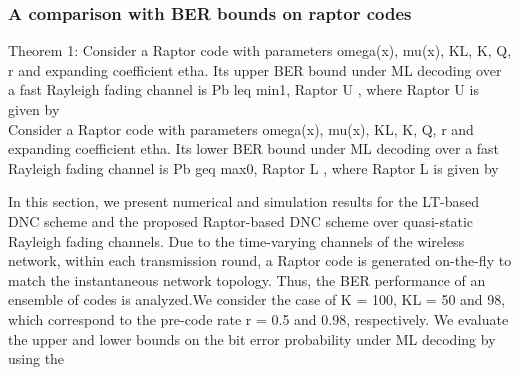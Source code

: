 \subsubsection{A comparison with BER bounds on raptor codes}
Theorem 1: Consider a Raptor code with parameters omega(x),
mu(x), KL, K, Q, r and expanding coefficient etha. Its upper
BER bound under ML decoding over a fast Rayleigh fading
channel is Pb leq min{1, Raptor
U
}, where Raptor
U is given by\\

Consider a Raptor code with parameters omega(x),
mu(x), KL, K, Q, r and expanding coefficient etha. Its lower
BER bound under ML decoding over a fast Rayleigh fading
channel is Pb geq max{0, Raptor
L
}, where Raptor
L is given by

In this section, we present numerical and simulation results
for the LT-based DNC scheme and the proposed Raptor-based
DNC scheme over quasi-static Rayleigh fading channels. Due
to the time-varying channels of the wireless network, within
each transmission round, a Raptor code is generated on-the-fly
to match the instantaneous network topology. Thus, the BER
performance of an ensemble of codes is analyzed.We consider
the case of K = 100, KL = 50 and 98, which correspond to
the pre-code rate r = 0.5 and 0.98, respectively. We evaluate
the upper and lower bounds on the bit error probability under
ML decoding by using the
